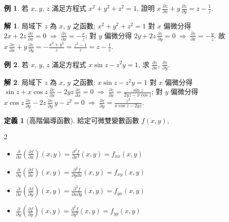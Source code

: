 \documentclass[12pt]{extarticle}
\newcommand{\ds}{\displaystyle}
\newcommand{\ie}{\;\Longrightarrow\;}
\theoremstyle{definition}
\newtheorem*{dfn}{定義}
\newtheorem*{ex}{例}
\newtheorem*{sol}{解}
\newcommand{\pdiff}[2]{\frac{\partial #1}{\partial #2}}
\begin{document}
\begin{ex}
  若 $x$, $y$, $z$ 滿足方程式 $\ds x^2 + y^2 + z^2 = 1$, 證明 $\ds x\,\pdiff{z}{x} + y\,\pdiff{z}{y} = z - \frac{1}{z}$. 
\end{ex}

\begin{sol}
  局域下 $z$ 為 $x$, $y$ 之函數; $\ds x^2 + y^2 + z^2 = 1$ 對 $x$ 偏微分得 $\ds 2x + 2z\,\pdiff{z}{x} = 0 \ie \pdiff{z}{x} = -\frac{x}{z}$; 對 $y$ 偏微分得 $\ds 2y + 2z\,\pdiff{z}{y} = 0 \ie \pdiff{z}{x} = -\frac{y}{z}$. 故 $\ds x\,\pdiff{z}{x} + y\,\pdiff{z}{y} = -\frac{x^2 + y^2}{z} = \frac{z^2 - 1}{z} = z - \frac{1}{z}$. 
\end{sol}

\begin{ex}
  若 $x$, $y$, $z$ 滿足方程式 $\ds x\sin z - z^2 y = 1$, 求 $\ds\pdiff{z}{x}$, $\ds\pdiff{z}{y}$. 
\end{ex}

\begin{sol}
  局域下 $z$ 為 $x$, $y$ 之函數; $\ds x\sin z - z^2 y = 1$ 對 $x$ 偏微分得 $\ds\sin z + x\cos z\,\pdiff{z}{x} - 2yz\,\pdiff{z}{x} = 0 \ie \pdiff{z}{x} = \frac{\sin z}{2yz - x\cos z}$; 對 $y$ 偏微分得 $\ds x\cos z\,\pdiff{z}{y} - 2z\,\pdiff{z}{y}\,y - z^2 = 0 \ie \pdiff{z}{y} = \frac{z^2}{x\cos z - 2yz}$. 
\end{sol}

\begin{dfn}[高階偏導函數] 給定可微雙變數函數 $f(x, y)$, 
  \begin{multicols}{2}
    \begin{itemize}\setlength{\itemsep}{0pt}
      \item $\ds\pdiff{}{x}\left(\pdiff{f}{x}\right)(x,y) = \frac{\partial^2 f}{\partial x^2}(x,y) = f_{xx}(x,y)$
      \item $\ds\pdiff{}{y}\left(\pdiff{f}{x}\right)(x,y) = \frac{\partial^2 f}{\partial y\partial x}(x,y) = f_{xy}(x,y)$
      \item $\ds\pdiff{}{x}\left(\pdiff{f}{y}\right)(x,y) = \frac{\partial^2 f}{\partial x\partial y}(x,y) = f_{yx}(x,y)$
      \item $\ds\pdiff{}{y}\left(\pdiff{f}{y}\right)(x,y) = \frac{\partial^2 f}{\partial y^2}(x,y) = f_{yy}(x,y)$
    \end{itemize}
  \end{multicols}
\end{dfn}
\end{document}
